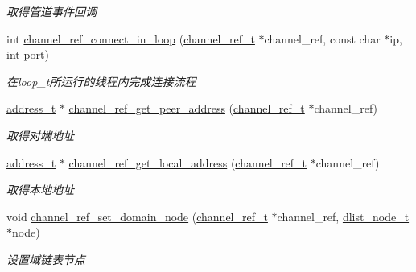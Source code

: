 \begin{DoxyCompactItemize}
\begin{DoxyCompactList}\small\item\em 取得管道事件回调 \end{DoxyCompactList}\item 
int \hyperlink{a00041_a593567b0d669138e1c1103ac331da7a5_a593567b0d669138e1c1103ac331da7a5}{channel\+\_\+ref\+\_\+connect\+\_\+in\+\_\+loop} (\hyperlink{a00044_a151271c9d188ef28d4d24bb81dcc1263_a151271c9d188ef28d4d24bb81dcc1263}{channel\+\_\+ref\+\_\+t} $\ast$channel\+\_\+ref, const char $\ast$ip, int port)
\begin{DoxyCompactList}\small\item\em 在loop\+\_\+t所运行的线程内完成连接流程 \end{DoxyCompactList}\item 
\hyperlink{a00044_a7a6e75b85c8b441f843bd40004a7d9d5_a7a6e75b85c8b441f843bd40004a7d9d5}{address\+\_\+t} $\ast$ \hyperlink{a00084_ga7bcafd2461a1edfde9c581cb946dcd44_ga7bcafd2461a1edfde9c581cb946dcd44}{channel\+\_\+ref\+\_\+get\+\_\+peer\+\_\+address} (\hyperlink{a00044_a151271c9d188ef28d4d24bb81dcc1263_a151271c9d188ef28d4d24bb81dcc1263}{channel\+\_\+ref\+\_\+t} $\ast$channel\+\_\+ref)
\begin{DoxyCompactList}\small\item\em 取得对端地址 \end{DoxyCompactList}\item 
\hyperlink{a00044_a7a6e75b85c8b441f843bd40004a7d9d5_a7a6e75b85c8b441f843bd40004a7d9d5}{address\+\_\+t} $\ast$ \hyperlink{a00084_ga1dcf6af0c992fa21f9dcd03c8f763ec4_ga1dcf6af0c992fa21f9dcd03c8f763ec4}{channel\+\_\+ref\+\_\+get\+\_\+local\+\_\+address} (\hyperlink{a00044_a151271c9d188ef28d4d24bb81dcc1263_a151271c9d188ef28d4d24bb81dcc1263}{channel\+\_\+ref\+\_\+t} $\ast$channel\+\_\+ref)
\begin{DoxyCompactList}\small\item\em 取得本地地址 \end{DoxyCompactList}\item 
void \hyperlink{a00041_a31d88025a8c93858b7784ce1f89cfffe_a31d88025a8c93858b7784ce1f89cfffe}{channel\+\_\+ref\+\_\+set\+\_\+domain\+\_\+node} (\hyperlink{a00044_a151271c9d188ef28d4d24bb81dcc1263_a151271c9d188ef28d4d24bb81dcc1263}{channel\+\_\+ref\+\_\+t} $\ast$channel\+\_\+ref, \hyperlink{a00044_a62053232bcf3566010ef98a7d77c3cc8_a62053232bcf3566010ef98a7d77c3cc8}{dlist\+\_\+node\+\_\+t} $\ast$node)
\begin{DoxyCompactList}\small\item\em 设置域链表节点 \end{DoxyCompactList}\item 

\end{DoxyCompactItemize}
